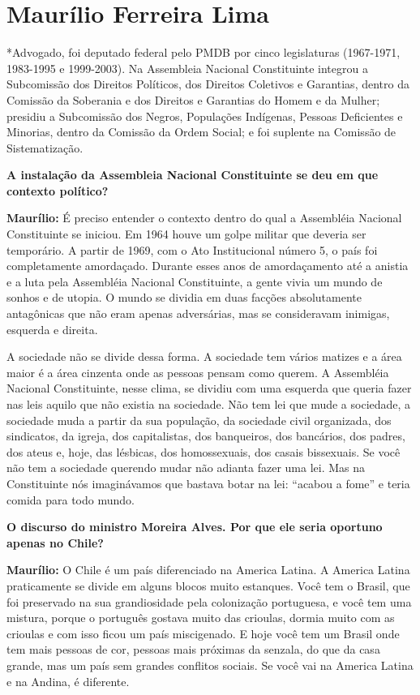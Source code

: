 \section{Maurílio Ferreira Lima}

*Advogado, foi deputado federal pelo PMDB por cinco legislaturas
(1967-1971, 1983-1995 e 1999-2003). Na Assembleia Nacional Constituinte
integrou a Subcomissão dos Direitos Políticos, dos Direitos Coletivos e
Garantias, dentro da Comissão da Soberania e dos Direitos e Garantias do
Homem e da Mulher; presidiu a Subcomissão dos Negros, Populações
Indígenas, Pessoas Deficientes e Minorias, dentro da Comissão da Ordem
Social; e foi suplente na Comissão de Sistematização.

\textbf{A instalação da Assembleia Nacional Constituinte se deu em que
contexto político? }

\textbf{Maurílio:} É preciso entender o contexto dentro do qual a
Assembléia Nacional Constituinte se iniciou. Em 1964 houve um golpe
militar que deveria ser temporário. A partir de 1969, com o Ato
Institucional número 5, o país foi completamente amordaçado. Durante
esses anos de amordaçamento até a anistia e a luta pela Assembléia
Nacional Constituinte, a gente vivia um mundo de sonhos e de utopia. O
mundo se dividia em duas facções absolutamente antagônicas que não eram
apenas adversárias, mas se consideravam inimigas, esquerda e direita.

A sociedade não se divide dessa forma. A sociedade tem vários matizes e
a área maior é a área cinzenta onde as pessoas pensam como querem. A
Assembléia Nacional Constituinte, nesse clima, se dividiu com uma
esquerda que queria fazer nas leis aquilo que não existia na sociedade.
Não tem lei que mude a sociedade, a sociedade muda a partir da sua
população, da sociedade civil organizada, dos sindicatos, da igreja, dos
capitalistas, dos banqueiros, dos bancários, dos padres, dos ateus e,
hoje, das lésbicas, dos homossexuais, dos casais bissexuais. Se você não
tem a sociedade querendo mudar não adianta fazer uma lei. Mas na
Constituinte nós imaginávamos que bastava botar na lei: ``acabou a
fome'' e teria comida para todo mundo.

\textbf{O discurso do ministro Moreira Alves. Por que ele seria oportuno
apenas no Chile?}

\textbf{Maurílio:} O Chile é um país diferenciado na America Latina. A
America Latina praticamente se divide em alguns blocos muito estanques.
Você tem o Brasil, que foi preservado na sua grandiosidade pela
colonização portuguesa, e você tem uma mistura, porque o português
gostava muito das crioulas, dormia muito com as crioulas e com isso
ficou um país miscigenado. E hoje você tem um Brasil onde tem mais
pessoas de cor, pessoas mais próximas da senzala, do que da casa grande,
mas um país sem grandes conflitos sociais. Se você vai na America Latina
e na Andina, é diferente.

